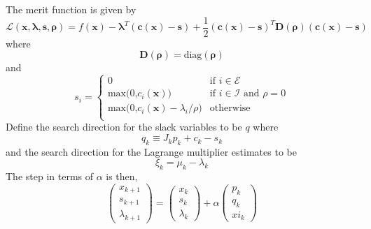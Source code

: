 \documentclass[]{aiaa-tc}%
\begin{document}
The merit function is given by
%
\begin{equation}
     \mathcal{L}(\mathbf{x},\boldsymbol{\lambda},\mathbf{s},\boldsymbol{\rho}) = f(\mathbf{x}) - \boldsymbol{\lambda}^T\left(\mathbf{c}(\mathbf{x}) - \mathbf{s}\right)
      + \frac{1}{2} \left(\mathbf{c}(\mathbf{x}) - \mathbf{s}\right)^T \mathbf{D}(\boldsymbol{\rho}) \left(\mathbf{c}(\mathbf{x}) - \mathbf{s}\right)
\end{equation}
%
where
%
\begin{equation}
     \mathbf{D}(\boldsymbol{\rho}) = \mbox{diag}(\boldsymbol{\rho})
\end{equation}
%
and
%
\begin{equation}
 s_i = \left\{
    \begin{array}{llcc}
        0                               & \mbox{if $i \in \mathcal{E}$}\\
        \mbox{max(0,$c_i(\mathbf{x})$)} & \mbox{if $i \in \mathcal{I}$ and $\rho = 0$}\\
        \mbox{max(0,$c_i(\mathbf{x}) - \lambda_i/\rho$)} & \mbox{otherwise}\\
    \end{array}
 \right.
\end{equation}
%
Define the search direction for the slack variables to be $q$ where
%
\begin{equation}
     q_k \equiv J_k p_k + c_k - s_k
\end{equation}
%
and the search direction for the Lagrange multiplier estimates to be
%
\begin{equation}
     \xi_k = \mu_k - \lambda_k
\end{equation}
%
The step in terms of $\alpha$ is then,
%
\begin{equation}
   \left(
   \begin{array}{ccc}
       x_{k+1}\\
       s_{k+1}\\
       \lambda_{k+1}
   \end{array}
   \right) =
    \left(
    \begin{array}{ccc}
       x_{k}\\
       s_{k}\\
       \lambda_{k}
   \end{array}
   \right) +
    \alpha  \left(
    \begin{array}{ccc}
       p_{k}\\
       q_{k}\\
       xi_{k}
   \end{array}
   \right)
\end{equation}
\end{document}
